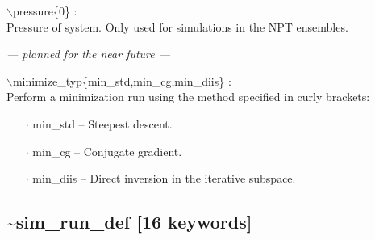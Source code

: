\documentclass[12pt,titlepage]{article}
\begin{document}
\begin{enumerate}
 \vspace{0.15in} 
 \item   $\backslash$pressure\{0\} : \\
     Pressure of system.  Only used for simulations in the NPT ensembles.



 \vspace{0.15in} 
{\it
--- planned for the near future ---\\
 \item  $\backslash$minimize\_typ\{min\_std,min\_cg,min\_diis\} : \\
     Perform a minimization run using the method specified in curly brackets:
     \begin{itemize}
        \item[$\cdot$] min\_std -- Steepest descent.
        \item[$\cdot$] min\_cg -- Conjugate gradient.
        \item[$\cdot$] min\_diis -- Direct inversion in the 
                                          iterative subspace.
     \end{itemize}
}

\end{enumerate}


\newpage
\subsection*{\bf \~{}sim\_run\_def [16 keywords]}
\end{document}
